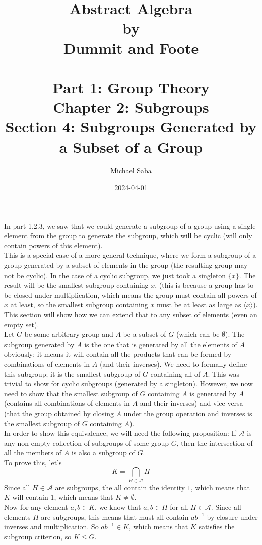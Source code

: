 \documentclass[12pt]{article}
\title{%
    \Huge Abstract Algebra \\
    \large by \\
    \Large Dummit and Foote \\~\\
    \huge Part 1: Group Theory \\
    \LARGE Chapter 2: Subgroups \\
    \Large Section 4: Subgroups Generated by a Subset of a Group
}
\date{2024-04-01}
\author{Michael Saba}
\newcommand{\ang}[1]{\langle #1 \rangle}
\begin{document}
    \maketitle
    \newpage

    In part 1.2.3, we saw that we could generate a subgroup
    of a group using a single element from the group to
    generate the subgroup,
    which will be cyclic (will only contain powers of this element). \\
    This is a special case of a more general technique,
    where we form a subgroup of a group generated by
    a subset of elements in the group
    (the resulting group may not be cyclic). 
    In the case of a cyclic subgroup,
    we just took a singleton $\{x\}$.
    The result will be the smallest subgroup containing $x$,
    (this is because a group has to be closed under multiplication,
    which means the group must contain all powers of $x$ at least,
    so the smallest subgroup containing $x$ must be at least
    as large as $\ang{x}$). \\
    This section will show how we can extend that to any subset
    of elements (even an empty set). \\

    Let $G$ be some arbitrary group and $A$ be a subset of $G$
    (which can be $\emptyset$).
    The subgroup generated by $A$ is the one that is generated
    by all the elements of $A$ obviously;
    it means it will contain all the products that can be formed by
    combinations of elements in $A$ (and their inverses).
    We need to formally define this subgroup;
    it is the smallest subgroup of $G$ containing all of $A$.
    This was trivial to show for cyclic subgroups
    (generated by a singleton).
    However, we now need to show that
    the smallest subgroup of $G$ containing $A$
    is generated by $A$
    (contains all combinations of elements in $A$
    and their inverses)
    and vice-versa
    (that the group obtained by closing $A$
    under the group operation and inverses
    is the smallest subgroup of $G$ containing $A$). \\

    In order to show this equivalence,
    we will need the following proposition:
    If $\mathcal{A}$ is any non-empty collection of subgroups of
    some group $G$,
    then the intersection of all the members of $A$
    is also a subgroup of $G$. \\
    To prove this, let's 
    \[ K = \bigcap_{H \in \mathcal{A}} H \]
    Since all $H \in \mathcal{A}$ are subgroups,
    the all contain the identity $1$,
    which means that $K$ will contain $1$,
    which means that $K \neq \emptyset$. \\
    Now for any element $a, b \in K$,
    we know that $a, b \in H$ for all $H \in \mathcal{A}$.
    Since all elements $H$ are subgroups,
    this means that must all contain $ab^{-1}$
    by closure under inverses and multiplication.
    So $ab^{-1} \in K$,
    which means that $K$ satisfies the subgroup criterion,
    so $K \leqslant G$. \\
\end{document}

